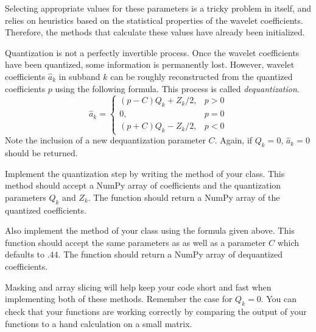 Selecting appropriate values for these parameters is a tricky problem in itself, and relies on heuristics based on the statistical properties of the wavelet coefficients.
Therefore, the methods that calculate these values have already been initialized.

Quantization is not a perfectly invertible process.
Once the wavelet coefficients have been quantized, some information is permanently lost.
However, wavelet coefficients $\hat{a}_k$ in subband $k$ can be roughly reconstructed from the quantized coefficients $p$ using the following formula.
This process is called \emph{dequantization}.
\[
\hat{a}_k =
\begin{cases}
(p-C)Q_k + Z_k/2, & p> 0\\
0, & p = 0\\
(p + C)Q_k - Z_k/2, & p < 0
\end{cases}
\]
Note the inclusion of a new dequantization parameter $C$.
Again, if $Q_k = 0$, $\hat{a}_k = 0$ should be returned.

\begin{problem}
Implement the quantization step by writing the  method of your class.
This method should accept a NumPy array of coefficients and the quantization parameters $Q_k$ and $Z_k$.
The function should return a NumPy array of the quantized coefficients.

Also implement the  method of your class using the formula given above.
This function should accept the same parameters as  as well as a parameter $C$ which defaults to $.44$.
The function should return a NumPy array of dequantized coefficients.

Masking and array slicing will help keep your code short and fast when implementing both of these methods.
Remember the case for $Q_k=0$.
You can check that your functions are working correctly by comparing the output of your functions to a hand calculation on a small matrix.
\end{problem}

